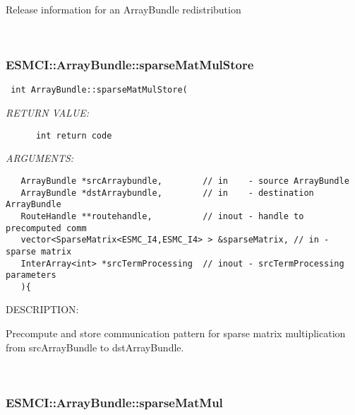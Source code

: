       Release information for an ArrayBundle redistribution
   
 
\mbox{}\hrulefill\
 
\subsubsection [ESMCI::ArrayBundle::sparseMatMulStore] {ESMCI::ArrayBundle::sparseMatMulStore}


  
\begin{verbatim} int ArrayBundle::sparseMatMulStore(\end{verbatim}{\em RETURN VALUE:}
\begin{verbatim}      int return code\end{verbatim}{\em ARGUMENTS:}
\begin{verbatim}   ArrayBundle *srcArraybundle,        // in    - source ArrayBundle
   ArrayBundle *dstArraybundle,        // in    - destination ArrayBundle
   RouteHandle **routehandle,          // inout - handle to precomputed comm
   vector<SparseMatrix<ESMC_I4,ESMC_I4> > &sparseMatrix, // in - sparse matrix
   InterArray<int> *srcTermProcessing  // inout - srcTermProcessing parameters
   ){    \end{verbatim}
{\sf DESCRIPTION:\\ }


    Precompute and store communication pattern for sparse matrix multiplication
    from srcArrayBundle to dstArrayBundle.
  
   
 
\mbox{}\hrulefill\
 
\subsubsection [ESMCI::ArrayBundle::sparseMatMul] {ESMCI::ArrayBundle::sparseMatMul}


